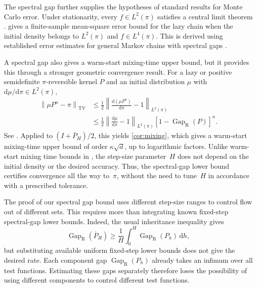 \documentclass[11pt]{article}
\newcommand{\Gap}{\operatorname{Gap}_{\mathrm{R}}}
\newcommand{\norm}[1]{\left\lVert #1\right\rVert}
\newcommand{\1}{\mathbf 1}
\newcommand{\df}{\mathrm{d}}
\begin{document}
	The spectral gap further supplies the hypotheses of standard results for
	Monte Carlo error. Under stationarity, every $f\in L^2(\pi)$ satisfies
	a central limit theorem
	\citep{KipnisVaradhan1986,RobertsRosenthal2008VarianceBounding}.
	 gives a finite-sample mean-square
	error bound for the lazy chain when the initial density belongs to
	$L^2(\pi)$ and $f\in L^4(\pi)$. 
	This is derived using established error estimates for general Markov chains with spectral gaps
	\citep{Rudolf2012,Paulin2015}. 
	
	
	A spectral gap also gives a warm-start mixing-time upper bound, but it provides this through a stronger geometric convergence result.
	For a lazy or positive semidefinite $\pi$-reversible kernel $P$ and
	an initial distribution $\mu$ with $\df\mu/\df\pi\in L^2(\pi)$,
	\begin{equation}\label{eq:TVbound}
		\begin{aligned}
			\norm{\mu P^n-\pi}_{\mathrm{TV}}
			&\leq\frac12\norm{\frac{\df(\mu P^n)}{\df\pi}-1}_{L^2(\pi)}\\
			&\leq\frac12\norm{\frac{\df\mu}{\df\pi}-1}_{L^2(\pi)}
			[1-\Gap(P)]^n.
		\end{aligned}
	\end{equation}
	See \citet{RobertsRosenthal1997Hybrid,KontoyiannisMeyn2012,Rudolf2012}.
	Applied to $(I+\overline P_H)/2$, this yields \cref{cor:mixing}, which gives a warm-start mixing-time upper bound of order $\kappa \sqrt{d}$, up to logarithmic factors.
	Unlike warm-start mixing time bounds in \cite{ChewiEtAl2021,WuSchmidlerChen2022}, the step-size parameter~$H$ does not depend on the initial density or the desired accuracy. 
	Thus, the spectral-gap lower bound certifies convergence all the way to~$\pi$, without the need to tune~$H$ in accordance with a prescribed tolerance.
	
	
	
	The proof of our spectral gap bound uses different step-size ranges to control flow out of
	different sets. This requires more than integrating known fixed-step
	spectral-gap lower bounds. Indeed, the usual inheritance inequality
	\citep{GrazziLivingstoneRiouDurand2026} gives
	\[
	\Gap(\overline P_H)\geq\frac1H\int_0^H\Gap(P_h)\,\df h,
	\]
	but substituting available uniform fixed-step lower bounds does not give
	the desired rate. Each component gap $\Gap(P_h)$ already takes an infimum over all
	test functions. Estimating these gaps separately therefore loses the
	possibility of using different components to control different test functions.
	
\end{document}
